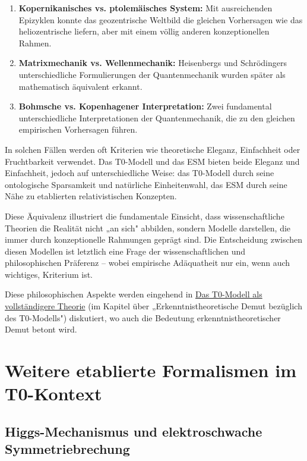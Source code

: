 \documentclass[12pt,a4paper]{article}
\begin{document}
	\begin{enumerate}
		\item \textbf{Kopernikanisches vs. ptolemäisches System:} Mit ausreichenden Epizyklen konnte das geozentrische Weltbild die gleichen Vorhersagen wie das heliozentrische liefern, aber mit einem völlig anderen konzeptionellen Rahmen.
		
		\item \textbf{Matrixmechanik vs. Wellenmechanik:} Heisenbergs und Schrödingers unterschiedliche Formulierungen der Quantenmechanik wurden später als mathematisch äquivalent erkannt.
		
		\item \textbf{Bohmsche vs. Kopenhagener Interpretation:} Zwei fundamental unterschiedliche Interpretationen der Quantenmechanik, die zu den gleichen empirischen Vorhersagen führen.
	\end{enumerate}
	
	In solchen Fällen werden oft Kriterien wie theoretische Eleganz, Einfachheit oder Fruchtbarkeit verwendet. Das T0-Modell und das ESM bieten beide Eleganz und Einfachheit, jedoch auf unterschiedliche Weise: das T0-Modell durch seine ontologische Sparsamkeit und natürliche Einheitenwahl, das ESM durch seine Nähe zu etablierten relativistischen Konzepten.
	
	Diese Äquivalenz illustriert die fundamentale Einsicht, dass wissenschaftliche Theorien die Realität nicht „an sich" abbilden, sondern Modelle darstellen, die immer durch konzeptionelle Rahmungen geprägt sind. Die Entscheidung zwischen diesen Modellen ist letztlich eine Frage der wissenschaftlichen und philosophischen Präferenz – wobei empirische Adäquatheit nur ein, wenn auch wichtiges, Kriterium ist.
	
	Diese philosophischen Aspekte werden eingehend in \href{https://github.com/jpascher/T0-Time-Mass-Duality/tree/main/2/pdf/English/T0-ModelAsCompleteTheory_En.pdf}{Das T0-Modell als vollständigere Theorie} (im Kapitel über „Erkenntnistheoretische Demut bezüglich des T0-Modells") diskutiert, wo auch die Bedeutung erkenntnistheoretischer Demut betont wird.
	
	\section{Weitere etablierte Formalismen im T0-Kontext}
	\label{sec:other_formalisms}
	
	\subsection{Higgs-Mechanismus und elektroschwache Symmetriebrechung}
	\label{subsec:higgs_mechanism}
	
\end{document}
